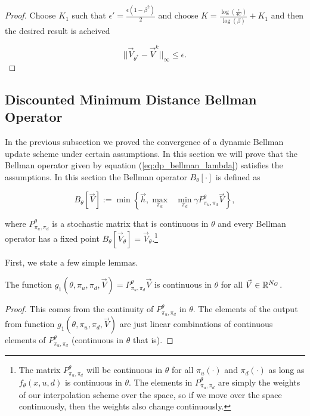 \documentclass[letterpaper, 10 pt, conference]{ieeeconf}
\begin{document}
\begin{proof}
\noindent  Choose $K_1$ such that  $\epsilon' =\frac{\epsilon(1-\beta^2)}{2}$ and choose $K= \frac{\log(\frac{\epsilon}{4C})}{\log(\beta)} +K_1$ and then the desired result is acheived

\begin{equation*}
||\vec{V}_{\theta^*}-\vec{V}^{k}||_{\infty}\leq \epsilon.
\end{equation*}
\end{proof}


\subsection{Discounted Minimum Distance Bellman Operator}
In the previous subsection we proved the convergence of a dynamic Bellman update scheme under certain assumptions. In this section we will prove that the Bellman operator given by equation (\ref{eq:dp_bellman_lambda}) satisfies the assumptions. In this section the Bellman operator $B_{\theta}[\cdot]$ is defined as

\begin{equation}
B_{\theta}[\vec{V}] := \min\left\{ \vec{h}, \underset{\pi_u}{\max}\text{ }\underset{ \pi_d}{\min} \gamma P^{\theta}_{\pi_u, \pi_d} \vec{V} \right \},
\end{equation}

\noindent where $P^{\theta}_{\pi_u, \pi_d}$ is a stochastic matrix that is continuous in $\theta$ and every Bellman operator has a fixed point $B_{\theta}[\vec{V}_{\theta}]=\vec{V}_{\theta}$.\footnote{The matrix $P^{\theta}_{\pi_u, \pi_d}$ will be continuous in $\theta$ for all $\pi_u(\cdot)$ and $\pi_d(\cdot)$ as long as $f_{\theta}(x,u,d)$ is continuous in $\theta$. The elements in $P^{\theta}_{\pi_u, \pi_d}$ are simply the weights of our interpolation scheme over the space, so if we move over the space continuously, then the weights also change continuously.}

First, we state a few simple lemmas.
\begin{lemma}
The function $g_1(\theta,\pi_u,\pi_d,\vec{V})=  P^{\theta}_{\pi_u, \pi_d} \vec{V}$ is continuous in $\theta$ for all $\vec{V}\in \mathbb{R}^{N_G}$.
\end{lemma}

\begin{proof}
This comes from the continuity of $P^{\theta}_{\pi_u, \pi_d}$ in $\theta$. The elements of the output from function $g_1(\theta,\pi_u,\pi_d,\vec{V})$ are just linear combinations of continuous elements of $P^{\theta}_{\pi_u, \pi_d}$ (continuous in $\theta$ that is).
\end{proof}
\end{document}

